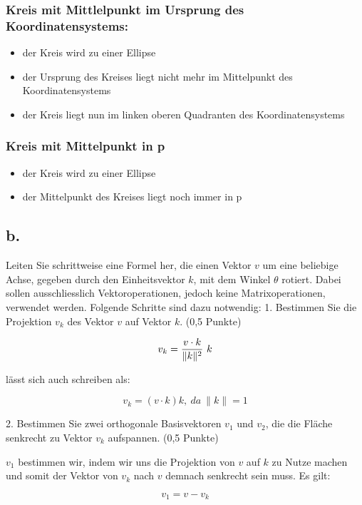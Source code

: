 \documentclass[12pt]{scrreprt}
\begin{document}
\subsubsection*{Kreis mit Mittlelpunkt im Ursprung des Koordinatensystems:}

\begin{itemize}
  \item der Kreis wird zu einer Ellipse
  \item der Ursprung des Kreises liegt nicht mehr im Mittelpunkt des
Koordinatensystems
  \item der Kreis liegt nun im linken oberen Quadranten des Koordinatensystems
\end{itemize}

\subsubsection*{Kreis mit Mittelpunkt in p}

\begin{itemize}
  \item der Kreis wird zu einer Ellipse
  \item der Mittelpunkt des Kreises liegt noch immer in p
\end{itemize}


\subsection*{b.}

Leiten Sie schrittweise eine Formel her, die einen Vektor $v$ um eine beliebige Achse, gegeben durch den
Einheitsvektor $k$, mit dem Winkel $\theta$ rotiert. Dabei sollen ausschliesslich Vektoroperationen, jedoch keine
Matrixoperationen, verwendet werden. Folgende Schritte sind dazu notwendig:
1. Bestimmen Sie die Projektion $v_k$ des Vektor $v$ auf Vektor $k$. (0,5 Punkte)

\[
	v_k = {v \cdot k \over \|k\|^2}~k
\]

lässt sich auch schreiben als:

\[
	v_k = (v \cdot k)k, ~da ~\| k \| = 1
\]

2. Bestimmen Sie zwei orthogonale Basisvektoren $v_1$ und $v_2$, die die Fläche senkrecht zu Vektor $v_k$
aufspannen. (0,5 Punkte)

$v_1$ bestimmen wir, indem wir uns die Projektion von $v$ auf $k$ zu Nutze machen und somit der Vektor von $v_k$ nach $v$ demnach senkrecht sein muss. Es gilt:

\[
v_1 = v - v_k
\]
\end{document}
